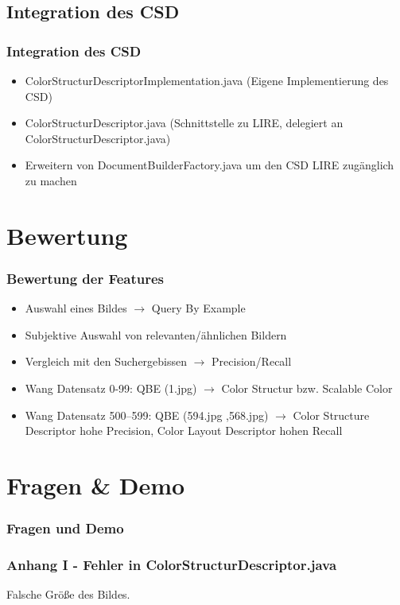 \documentclass[11pt]{beamer}
\begin{document}
\subsection{Integration des CSD}
\begin{frame}
	\frametitle{Integration des CSD}
	\begin{itemize}
	  \item ColorStructurDescriptorImplementation.java (Eigene Implementierung des CSD)
	  \item ColorStructurDescriptor.java (Schnittstelle zu LIRE, delegiert an ColorStructurDescriptor.java)
	  \item Erweitern von DocumentBuilderFactory.java um den CSD LIRE zugänglich zu machen
	\end{itemize}
\end{frame}

\section{Bewertung}
\begin{frame}
	\frametitle{Bewertung der Features}
	\begin{itemize}
	  \item Auswahl eines Bildes $\rightarrow$ Query By Example
	  \item Subjektive Auswahl von relevanten/ähnlichen Bildern
	  \item Vergleich mit den Suchergebissen $\rightarrow$ Precision/Recall
	  \item Wang Datensatz 0-99: QBE (1.jpg) $\rightarrow$ Color Structur bzw. Scalable Color
	  \item Wang Datensatz 500–599: QBE (594.jpg ,568.jpg) $\rightarrow$ Color Structure Descriptor hohe Precision, Color Layout Descriptor hohen Recall
	\end{itemize}
\end{frame}


\section{Fragen \& Demo}
\begin{frame}
	\frametitle{Fragen und Demo}
\end{frame}


\begin{frame}
	\frametitle{Anhang I - Fehler in ColorStructurDescriptor.java}
	Falsche Größe des Bildes.
	
\end{frame}
\end{document}
